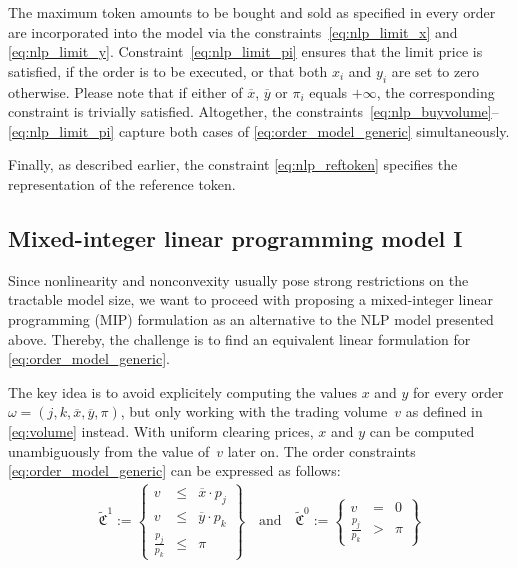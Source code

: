 \documentclass[11pt,parskip=full]{scrartcl}%
\begin{document}
The maximum token amounts to be bought and sold as specified in every order are incorporated
into the model via the constraints~\eqref{eq:nlp_limit_x} and \eqref{eq:nlp_limit_y}.
Constraint~\eqref{eq:nlp_limit_pi} ensures that the limit price is satisfied, if the order is
to be executed, or that both $ x_i $ and $ y_i $ are set to zero otherwise.
Please note that if either of $\overline{x}$, $\overline{y}$ or $\pi_i$ equals $+\infty$, the
corresponding constraint is trivially satisfied.
Altogether, the constraints~\eqref{eq:nlp_buyvolume}--\eqref{eq:nlp_limit_pi} capture both
cases of \eqref{eq:order_model_generic} simultaneously.

Finally, as described earlier, the constraint \eqref{eq:nlp_reftoken} specifies the representation of the reference token.


\newpage
\subsection{Mixed-integer linear programming model I}
\label{subsec:MIP1}

Since nonlinearity and nonconvexity usually pose strong restrictions on the tractable model size,
we want to proceed with proposing a mixed-integer linear programming (MIP) formulation as an
alternative to the NLP model presented above.
Thereby, the challenge is to find an equivalent linear formulation for 
\eqref{eq:order_model_generic}.

The key idea is to avoid explicitely computing the values $x$ and $y$ for every order~$\omega = (j,k,\overline{x},\overline{y},\pi)$, but only working with the trading volume~$v$ as defined in \eqref{eq:volume} instead.
With uniform clearing prices, $x$ and $y$ can be computed unambiguously from the value of~$v$ later on.
The order constraints \eqref{eq:order_model_generic} can be expressed as follows:
\begin{align}
  \tilde{\mathfrak{C}}^1 := \left\{
  \begin{array}{rlll}
    v &\le & \overline{x} \cdot p_j \\
    v &\le & \overline{y} \cdot p_k \\[1mm]
    \frac{p_j}{p_k} &\le & \pi
  \end{array}
  \right\}
  \quad
  \text{and}
  \quad
  \tilde{\mathfrak{C}}^0 := \left\{
  \begin{array}{rll}
    v &= & 0 \\[1mm]
    \frac{p_j}{p_k} &> & \pi
  \end{array}
  \right\}
  \label{eq:order_model_mip1}
\end{align}
\end{document}
